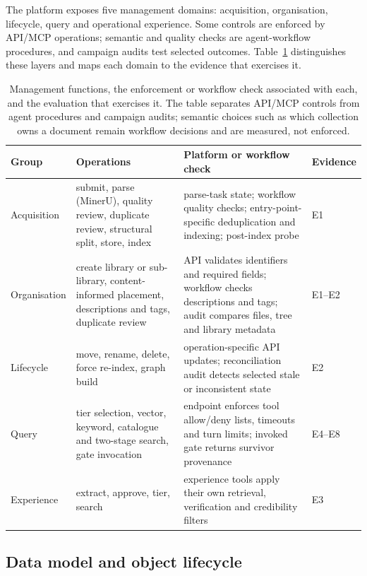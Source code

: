 The platform exposes five management domains: acquisition, organisation,
lifecycle, query and operational experience. Some controls are enforced by
API/MCP operations; semantic and quality checks are agent-workflow procedures,
and campaign audits test selected outcomes. Table~\ref{tab:functions}
distinguishes these layers and maps each domain to the evidence that exercises
it.

\begin{table}[t]
\centering
\small
\setlength{\tabcolsep}{4pt}
\caption{Management functions, the enforcement or workflow check associated
with each, and the evaluation that exercises it. The table separates API/MCP
controls from agent procedures and campaign audits; semantic choices such as
which collection owns a document remain workflow decisions and are measured,
not enforced.}
\label{tab:functions}
\begin{tabular}{@{}>{\raggedright\arraybackslash}p{}>{\raggedright\arraybackslash}p{}>{\raggedright\arraybackslash}p{}>{\raggedright\arraybackslash}p{}@{}}
\toprule
Group & Operations & Platform or workflow check & Evidence\\
\midrule
Acquisition & submit, parse (MinerU), quality review, duplicate review, structural split, store, index & parse-task state; workflow quality checks; entry-point-specific deduplication and indexing; post-index probe & E1\\
Organisation & create library or sub-library, content-informed placement, descriptions and tags, duplicate review & API validates identifiers and required fields; workflow checks descriptions and tags; audit compares files, tree and library metadata & E1--E2\\
Lifecycle & move, rename, delete, force re-index, graph build & operation-specific API updates; reconciliation audit detects selected stale or inconsistent state & E2\\
Query & tier selection, vector, keyword, catalogue and two-stage search, gate invocation & endpoint enforces tool allow/deny lists, timeouts and turn limits; invoked gate returns survivor provenance & E4--E8\\
Experience & extract, approve, tier, search & experience tools apply their own retrieval, verification and credibility filters & E3\\
\bottomrule
\end{tabular}
\end{table}

\subsection{Data model and object lifecycle}
\label{sec:datamodel}
\label{sec:lifecycle}

